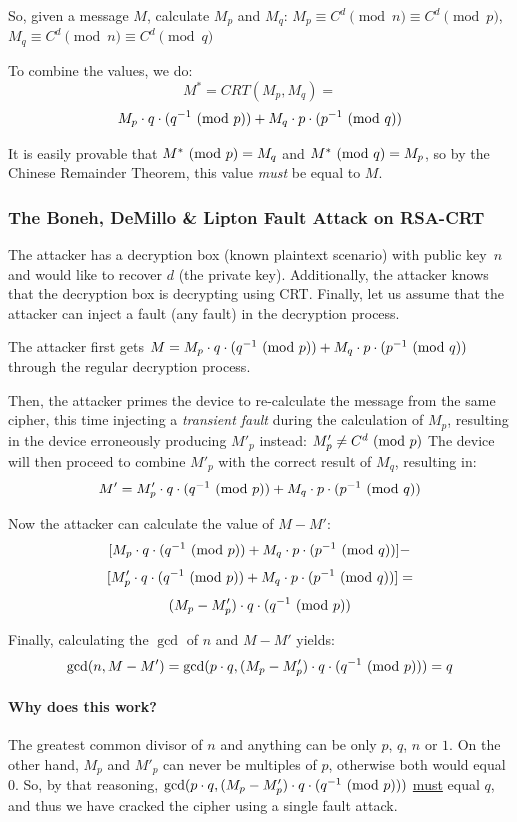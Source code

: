 So, given a message \(M\), calculate \(M_p\) and \(M_q\): \(M_p \equiv C^d
\pmod{n} \equiv C^d \pmod{p}\), \(M_q \equiv C^d \pmod{n} \equiv C^d \pmod{q}\)

To combine the values, we do:
\[M^* = CRT(M_p, M_q) = \]
\[M_p \cdot q \cdot (q^{-1} \ (\mathrm{mod}\ p)) + M_q \cdot p \cdot (p^{-1} \ (\mathrm{mod}\ q))\]

It is easily provable that \(M^* \ (\mathrm{mod}\ p) = M_q\) and \(M^* \ (\mathrm{mod}\ q) = M_p\), so
by the Chinese Remainder Theorem, this value \emph{must} be equal to \(M\).

\subsubsection{The Boneh, DeMillo \& Lipton Fault Attack on RSA-CRT~\cite{boneh}}\label{subsubsec:the_boneh_demillo_lipton_fault_attack_on_rsa_crt}

The attacker has a decryption box (known plaintext scenario) with public key\
\(n\) and would like to recover \(d\) (the private key). Additionally, the
attacker knows that the decryption box is decrypting using CRT\@. Finally, let
us assume that the attacker can inject a fault (any fault) in the decryption
process.

The attacker first gets \(M = M_p\cdot q\cdot (q^{-1} \ (\mathrm{mod}\ p)) + M_q\cdot
p\cdot (p^{-1} \ (\mathrm{mod}\ q))\) through the regular decryption process.

Then, the attacker primes the device to re-calculate the message from the same
cipher, this time injecting a \emph{transient fault} during the calculation of \(M_p\),
resulting in the device erroneously producing \(M'_p\) instead: \(M'_p \neq C^d
\ (\mathrm{mod}\ p)\) The device will then proceed to combine \(M'_p\) with the correct
result of \(M_q\), resulting in:
\[M' =  M'_p \cdot q \cdot (q^{-1} \ (\mathrm{mod}\ p)) + M_q \cdot p \cdot (p^{-1}
\ (\mathrm{mod}\ q))\]

Now the attacker can calculate the value of \(M - M'\):
\[[M_p \cdot q \cdot (q^{-1} \ (\mathrm{mod}\ p)) + M_q \cdot p \cdot (p^{-1} \ (\mathrm{mod}\ q))]-\]
\[[M'_p \cdot q \cdot (q^{-1} \ (\mathrm{mod}\ p)) + M_q \cdot p \cdot (p^{-1}
\ (\mathrm{mod}\ q))]=\]
\[(M_p - M'_p) \cdot q \cdot (q^{-1} \ (\mathrm{mod}\ p))\]

Finally, calculating the \(\gcd \) of \(n\) and \(M - M'\) yields:
\[\gcd(n, M - M') = \gcd(p \cdot q, (M_p - M'_p) \cdot q \cdot (q^{-1}
\ (\mathrm{mod}\ p))) = q\]

\paragraph{Why does this work?} The greatest common divisor of \(n\) and
anything can be only \(p\), \(q\), \(n\) or \(1\). On the other hand, \(M_p\)
and \(M'_p\) can never be multiples of \(p\), otherwise both would equal 0. So,
by that reasoning, \(\gcd(p \cdot q, (M_p - M'_p) \cdot q \cdot (q^{-1}
\ (\mathrm{mod}\ p)))\) \underline{must} equal \(q\), and thus we have cracked the cipher
using a single fault attack.

